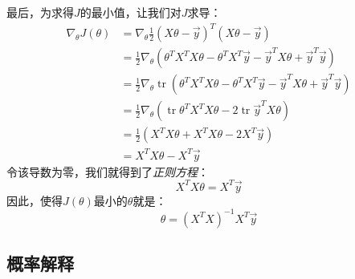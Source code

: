 \documentclass[hyperref, UTF8]{ctexart}
\DeclareMathOperator{\tr}{tr}
\begin{document}
最后，为求得$J$的最小值，让我们对$J$求导：
\begin{equation*}
\begin{split}
\nabla_\theta J(\theta) &= \nabla_\theta\frac{1}{2}(X\theta - \vec{y})^T(X\theta - \vec{y}) \\
&= \frac{1}{2}\nabla_\theta(\theta^TX^TX\theta - \theta^TX^T\vec{y} - \vec{y}^TX\theta + \vec{y}^T\vec{y}) \\
&= \frac{1}{2}\nabla_\theta\tr(\theta^TX^TX\theta - \theta^TX^T\vec{y} - \vec{y}^TX\theta + \vec{y}^T\vec{y}) \\
&= \frac{1}{2}\nabla_\theta(\tr\theta^TX^TX\theta - 2\tr\vec{y}^TX\theta) \\
&= \frac{1}{2}(X^TX\theta + X^TX\theta - 2X^T\vec{y}) \\
&= X^TX\theta - X^T\vec{y}
\end{split}
\end{equation*}
令该导数为零，我们就得到了\emph{正则方程}：
\begin{equation}
X^TX\theta = X^T\vec{y}
\end{equation}
因此，使得$J(\theta)$最小的$\theta$就是：
\begin{equation}
\theta = (X^TX)^{-1}X^T\vec{y}
\end{equation}

\subsection{概率解释}
\end{document}
